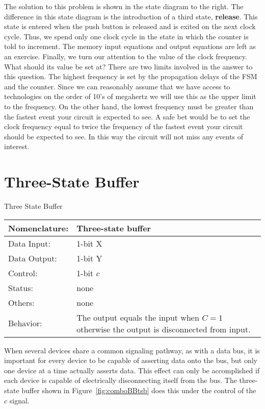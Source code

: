 The solution to this problem is shown in the state diagram to
the right.  The difference in this state diagram is the introduction
of a third state, \textbf{ release}.  This state is entered when the
push button is released and is exited on the next clock cycle.
Thus, we spend only one clock cycle in the state in which the
counter is told to increment.  The memory input equations and
output equations are left as an exercise.
Finally, we turn our attention to the value of the clock frequency.
What should its value be set at?  There are two limits involved
in the answer to this question.  The highest frequency is set by
the propagation delays of the FSM and the counter.  Since we
can reasonably assume that we have access to technologies on the
order of 10's of megahertz we will use this as the upper limit
to the frequency.  On the other hand, the lowest
frequency must be greater than the fastest event your circuit
is expected to see.  A safe bet would be to set the clock
frequency equal to twice the frequency of the fastest event your
circuit should be expected to see.   In this way the circuit
will not miss any events of interest.



\section{Three-State Buffer}
\begin{buildingblock}{Three State Buffer}
\label{buildingblock:threeStateBuffer}
\begin{tabular}{|l|p{3.5in}|} \hline
Nomenclature:  & Three-state buffer	\\ \hline
Data Input:    & 1-bit X		\\ \hline
Data Output:   & 1-bit Y		\\ \hline
Control:       & 1-bit $c$              \\ \hline
Status:        & none			\\ \hline
Others:        & none			\\ \hline
Behavior:      & The output equals the input when 
		$C=1$ otherwise the output is 
		disconnected from input. \\ \hline                                                                               
\end{tabular}
\label{page:tsb}
\end{buildingblock}

When several devices share a common signaling pathway, as with
a data bus, it is important for every device to be capable of 
asserting data onto the bus, but only one device at a time
actually asserts data.  This effect can only be accomplished if each
device is capable of electrically disconnecting itself from the
bus.  The three-state buffer shown in Figure~\ref{fig:comboBBtsb} does
this under the control of the $c$ signal.
                                                                                
